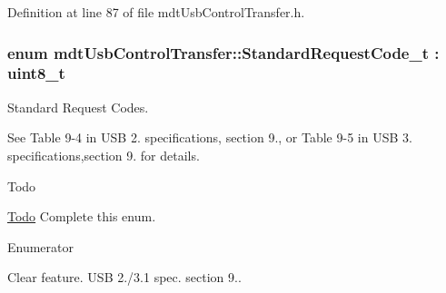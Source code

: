 Definition at line 87 of file mdt\-Usb\-Control\-Transfer.\-h.

\hypertarget{classmdt_usb_control_transfer_a9a13f68d5d4998dd8564c4e4c6278c77}{
\subsubsection[{Standard\-Request\-Code\-\_\-t}]{\setlength{\rightskip}{0pt plus 5cm}enum {\bf mdt\-Usb\-Control\-Transfer\-::\-Standard\-Request\-Code\-\_\-t} \-: uint8\-\_\-t\hspace{0.3cm}{\ttfamily [strong]}}}\label{classmdt_usb_control_transfer_a9a13f68d5d4998dd8564c4e4c6278c77}


Standard Request Codes. 

See Table 9-\/4 in U\-S\-B 2. specifications, section 9., or Table 9-\/5 in U\-S\-B 3. specifications,section 9. for details.

\begin{DoxyRefDesc}{Todo}
\item[\hyperlink{todo__todo000038}{Todo}]Complete this enum. \end{DoxyRefDesc}
\begin{Desc}
\item[Enumerator]\par
\begin{description}
\item[{\em 
\hypertarget{classmdt_usb_control_transfer_a9a13f68d5d4998dd8564c4e4c6278c77a055987b2a1850b3a8f19befda5ea79ab}{G\-E\-T\-\_\-\-S\-T\-A\-T\-U\-S}\label{classmdt_usb_control_transfer_a9a13f68d5d4998dd8564c4e4c6278c77a055987b2a1850b3a8f19befda5ea79ab}
}]\item[{\em 
\hypertarget{classmdt_usb_control_transfer_a9a13f68d5d4998dd8564c4e4c6278c77aba7daed095c1e4f1dc05e56562a04c81}{C\-L\-E\-A\-R\-\_\-\-F\-E\-A\-T\-U\-R\-E}\label{classmdt_usb_control_transfer_a9a13f68d5d4998dd8564c4e4c6278c77aba7daed095c1e4f1dc05e56562a04c81}
}]Clear feature. U\-S\-B 2./3.1 spec. section 9.. \end{description}
\end{Desc}


